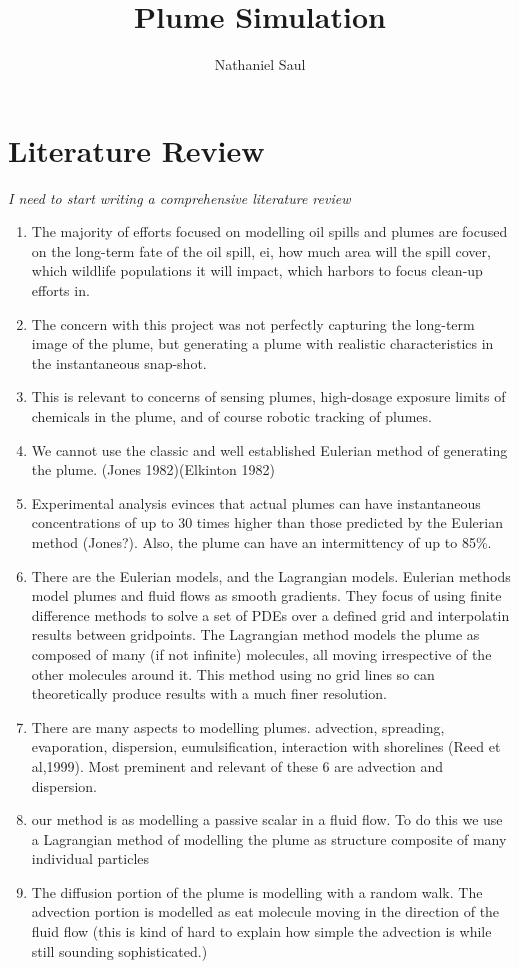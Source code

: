 \documentclass[11pt]{article} %
\title{Plume Simulation}
\author{Nathaniel Saul}
\begin{document}
\section{Literature Review}\emph{I need to start writing a comprehensive literature review}
\begin{enumerate}


\item The majority of efforts focused on modelling oil spills and plumes are focused on the long-term fate of the oil spill, ei, how much area will the spill cover, which wildlife populations it will impact, which harbors to focus clean-up efforts in.
\item The concern with this project was not perfectly capturing the long-term image of the plume, but generating a plume with realistic characteristics in the instantaneous snap-shot.  
\item This is relevant to concerns of sensing plumes, high-dosage exposure limits of chemicals in the plume, and of course robotic tracking of plumes.
\item We cannot use the classic and well established Eulerian method of generating the plume.  (Jones 1982)(Elkinton 1982)
\item Experimental analysis evinces that actual plumes can have instantaneous concentrations of up to 30 times higher than those predicted by the Eulerian method (Jones?).  Also, the plume can have an intermittency of up to 85\%. 

\item There are the Eulerian models, and the Lagrangian models.  Eulerian methods model plumes and fluid flows as smooth gradients.  They focus of using finite difference methods to solve a set of PDEs over a defined grid and interpolatin results between gridpoints.  The Lagrangian method models the plume as composed of many (if not infinite) molecules, all moving irrespective of the other molecules around it.  This method using no grid lines so can theoretically produce results with a much finer resolution.

\item There are many aspects to modelling plumes. advection, spreading, evaporation, dispersion, eumulsification, interaction with shorelines (Reed et al,1999).  Most preminent and relevant of these 6 are advection and dispersion.  
\item our method is as modelling a passive scalar in a fluid flow.  To do this we use a Lagrangian method of modelling the plume as structure composite of many individual particles
\item The diffusion portion of the plume is modelling with a random walk.  The advection portion is modelled as eat molecule moving in the direction of the fluid flow (this is kind of hard to explain how simple the advection is while still sounding sophisticated.)


\end{enumerate}
\end{document}

